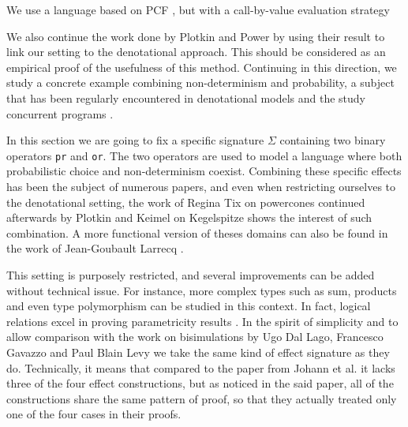 We use a language based on PCF \cite{plotkin1977lcf}, but with  a call-by-value 
evaluation strategy

We also continue the work done by Plotkin and Power \cite{plotkin2001adequacy}
by using their result to link our setting to the denotational approach. This 
should be considered as an empirical proof of the usefulness of this method. 
Continuing in this direction, we study a concrete example combining
non-determinism and probability, a subject that has been regularly encountered 
in denotational models \cite{tix2009semantic} \cite{JGL-mscs16}
\cite{KeimelP2016} and the study concurrent programs
\cite{Mislove2000} \cite{mislove2004axioms}.


In this section we are going to fix a specific signature $\Sigma$
containing two binary operators \texttt{pr} and \texttt{or}. The two
operators are used to model a language where both probabilistic choice 
and non-determinism coexist. Combining these specific effects has been 
the subject of numerous papers, and even when restricting ourselves to the 
denotational setting, the work of Regina Tix on powercones \cite{tix2009semantic} 
continued afterwards by Plotkin and Keimel \cite{KeimelP2016} on Kegelspitze
shows the interest of such combination.
A more functional version of theses domains can also be found in the work of Jean-Goubault Larrecq 
\cite{JGL-mscs16}.


This setting is purposely restricted, and several improvements can 
be added without technical issue. For instance, more complex types 
such as sum, products and even type polymorphism can be studied 
in this context. In fact, logical relations excel in proving parametricity 
results \cite{wadler1989theorems}.
In the spirit of simplicity 
and to allow comparison with the work on bisimulations by
Ugo Dal Lago, Francesco Gavazzo and Paul Blain Levy
\cite{Ugo2017} we take the same kind of effect signature 
as they do. Technically, it means that compared to 
the paper from Johann et al. \cite{gom} it lacks 
three of the four effect constructions, but as noticed 
in the said paper, all of the constructions share the
same pattern of proof, so that they actually treated 
only one of the four cases in their proofs.


